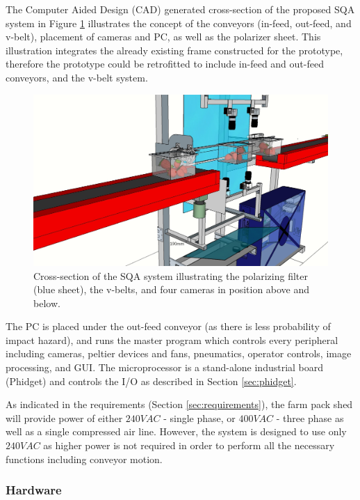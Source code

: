 \documentclass[fleqn,twoside]{article}
\begin{document}
The Computer Aided Design (CAD) generated cross-section of the proposed SQA system in Figure \ref{fig:cross_sec} illustrates the concept of the conveyors (in-feed, out-feed, and v-belt), placement of cameras and PC, as well as the polarizer sheet. This illustration integrates the already existing frame constructed for the prototype, therefore the prototype could be retrofitted to include in-feed and out-feed conveyors, and the v-belt system.  



\begin{figure}[h]
	\centering
	\includegraphics[width=.8\linewidth]{QAS_cross_sec.jpg}
	\caption{Cross-section of the SQA system illustrating the polarizing filter (blue sheet), the v-belts, and four cameras in position above and below.}
	\label{fig:cross_sec}
\end{figure}%



The PC is placed under the out-feed conveyor (as there is less probability of impact hazard), and runs the master program which controls every peripheral including cameras, peltier devices and fans, pneumatics, operator controls, image processing, and GUI. The microprocessor is a stand-alone industrial board (Phidget\texttrademark) and controls the I/O as described in Section \ref{sec:phidget}.

As indicated in the requirements (Section \ref{sec:requirements}), the farm pack shed will provide power of either $240VAC$ - single phase, or $400VAC$ - three phase as well as a single compressed air line. However, the system is designed to use only $240VAC$ as higher power is not required in order to perform all the necessary functions including conveyor motion.



\subsubsection{Hardware}
\end{document}
